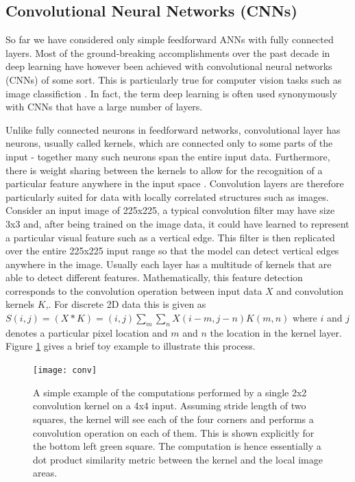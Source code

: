 \documentclass[12pt]{report}
\begin{document}
\subsection{Convolutional Neural Networks (CNNs)}

So far we have considered only simple feedforward ANNs with fully connected layers. Most of the ground-breaking accomplishments over the past decade in deep learning have however been achieved with convolutional neural networks (CNNs) \cite{Le} of some sort. This is particularly true for computer vision tasks such as image classifiction \cite{JurgenSchmidhuber2015}. In fact, the term deep learning is often used synonymously with CNNs that have a large number of layers.

Unlike fully connected neurons in feedforward networks, convolutional layer has neurons, usually called kernels, which are connected only to some parts of the input - together many such neurons span the entire input data. Furthermore, there is weight sharing between the kernels to allow for the recognition of a particular feature anywhere in the input space \cite{Lecun2015}. Convolution layers are therefore particularly suited for data with locally correlated structures such as images. Consider an input image of 225x225, a typical convolution filter may have size 3x3 and, after being trained on the image data, it could have learned to represent a particular visual feature such as a vertical edge. This filter is then replicated over the entire 225x225 input range so that the model can detect vertical edges anywhere in the image. Usually each layer has a multitude of kernels that are able to detect different features. Mathematically, this feature detection corresponds to the convolution operation between input data $X$ and convolution kernels $K$,. For discrete 2D data  this is given as $S(i, j) = (X \ast K)=(i, j) \sum_m \sum_n X(i-m, j-n)K(m, n)$ \cite{Goodfellow2016} where $i$ and $j$ denotes a particular pixel location and $m$ and $n$ the location in the kernel layer. Figure \ref{fig:conv} gives a brief toy example to illustrate this process. 
  
\begin{figure}
  \centering
	\texttt{[image: conv]}
	\caption{A simple example of the computations performed by a single 2x2 convolution kernel on a 4x4 input. Assuming stride length of two squares, the kernel will see each of the four corners and performs a convolution operation on each of them. This is shown explicitly for the bottom left green square. The computation is hence essentially a dot product similarity metric between the kernel and the local image areas.}
	\label{fig:conv}
\end{figure}
\end{document}
